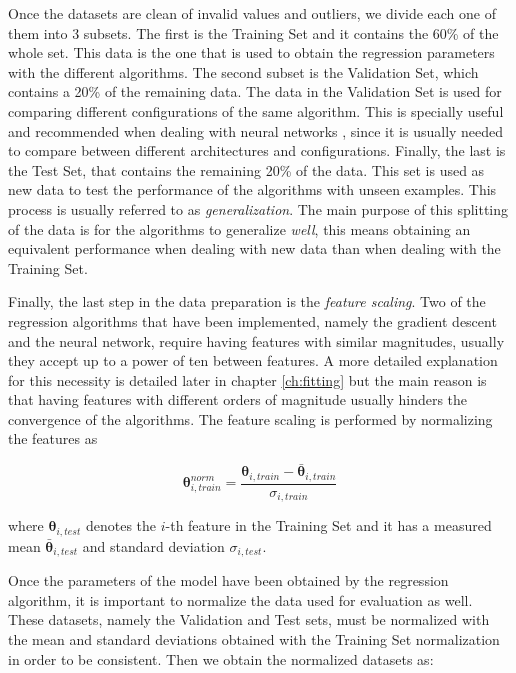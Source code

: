 \documentclass[a4paper, report, oneside, UKenglish]{memoir}
\newcommand{\btheta}{\boldsymbol{\theta}}
\begin{document}
Once the datasets are clean of invalid values and outliers, we divide each one of them into 3 subsets. The first is the Training Set and it contains the 60\% of the whole set. This data is the one that is used to obtain the regression parameters with the different algorithms. The second subset is the Validation Set, which contains a 20\% of the remaining data. The data in the Validation Set is used for comparing different configurations of the same algorithm. This is specially useful and recommended when dealing with neural networks \cite{aggarwal_neural_2018}, since it is usually needed to compare between different architectures and configurations. Finally, the last is the Test Set, that contains the remaining 20\% of the data. This set is used as new data to test the performance of the algorithms with unseen examples. This process is usually referred to as \textit{generalization}. The main purpose of this splitting of the data is for the algorithms to generalize \textit{well}, this means obtaining an equivalent performance when dealing with new data than when dealing with the Training Set.

Finally, the last step in the data preparation is the \textit{feature scaling}. Two of the regression algorithms that have been implemented, namely the gradient descent and the neural network, require having features with similar magnitudes, usually they accept up to a power of ten between features. A more detailed explanation for this necessity is detailed later in chapter \ref{ch:fitting} but the main reason is that having features with different orders of magnitude usually hinders the convergence of the algorithms. The feature scaling is performed by normalizing the features as

\begin{equation}
    \btheta_{i, train}^{norm} = \frac{\btheta_{i, train} - \bar{\btheta}_{i, train}}{\sigma_{i, train}}
\end{equation}

where $\btheta_{i, test}$ denotes the $i$-th feature in the Training Set and it has a measured mean $\bar{\btheta}_{i, test}$ and standard deviation $\sigma_{i, test}$. 

Once the parameters of the model have been obtained by the regression algorithm, it is important to normalize the data used for evaluation as well. These datasets, namely the Validation and Test sets, must be normalized with the mean and standard deviations obtained with the Training Set normalization in order to be consistent. Then we obtain the normalized datasets as:
\end{document}
